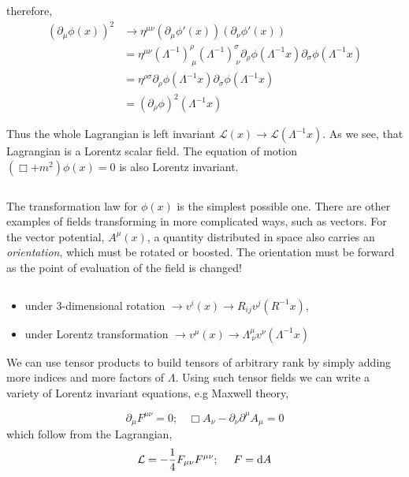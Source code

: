 therefore, 
\begin{equation}
    \begin{split}
        (\partial_{\mu}\phi(x))^2 &\rightarrow \eta^{\mu\nu}(\partial_{\mu}\phi'(x))(\partial_{\nu}\phi'(x))\\
        &= \eta^{\mu\nu}(\Lambda^{-1})^{\rho}_{\ \mu}(\Lambda^{-1})^{\sigma}_{\ \nu}\partial_{\rho}\phi(\Lambda^{-1}x)\partial_{\sigma}\phi(\Lambda^{-1}x)\\
        &=\eta^{\rho\sigma}\partial_{\rho}\phi(\Lambda^{-1}x)\partial_{\sigma}\phi(\Lambda^{-1}x)\\
        &=(\partial_{\rho}\phi)^2(\Lambda^{-1}x)
    \end{split}
\end{equation}

Thus the whole Lagrangian is left invariant $\mathcal{L}(x)\rightarrow \mathcal{L}(\Lambda^{-1}x)$. As we see, that Lagrangian is a Lorentz scalar field. The equation of motion $(\Box +m^2)\phi(x)=0$ is also Lorentz invariant. 

$ $

The transformation law for $\phi(x)$ is the simplest possible one. There are other examples of fields transforming in more complicated ways, such as vectors. For the vector potential, $A^{\mu}(x)$, a quantity distributed in space also carries an \textit{orientation}, which must be rotated or boosted. The orientation must be forward as the point of evaluation of the field is changed! 

$ $

\begin{itemize}
    \item under 3-dimensional rotation $\rightarrow v^{i}(x)\rightarrow R_{ij}v^{j}(R^{-1}x)$,
    \item under Lorentz transformation $\rightarrow v^{\mu}(x)\rightarrow \Lambda^{\mu}_{\ \nu}v^{\nu}(\Lambda^{-1}x)$
\end{itemize}

We can use tensor products to build tensors of arbitrary rank by simply adding more indices and more factors of $\Lambda$. Using such tensor fields we can write a variety of Lorentz invariant equations, e.g Maxwell theory, 

\begin{equation}
    \partial_{\mu}F^{\mu\nu}=0; \ \ \ \ \Box A_{\nu} - \partial_{\nu}\partial^{\mu}A_{\mu}=0
\end{equation}
 which follow from the Lagrangian, 
 \begin{equation}
     \mathcal{L} = -\frac{1}{4}F_{\mu\nu}F^{\mu\nu}; \ \ \ \ F = \d{}A
 \end{equation}

